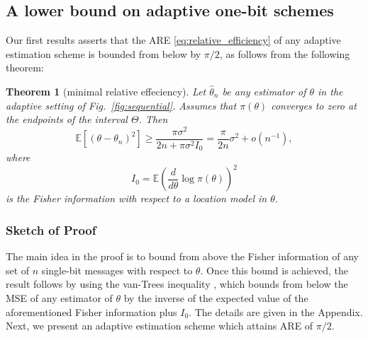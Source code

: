 \documentclass[letterpaper, conference]{IEEEtran}      %
\newtheorem{thm}{\bf{Theorem}}
\begin{document}
\subsection{A lower bound on adaptive one-bit schemes}
Our first results asserts that the ARE \eqref{eq:relative_efficiency} of any adaptive estimation scheme is bounded from below by $\pi/2$, as follows from the following theorem:
\begin{thm}[minimal relative effeciency] \label{thm:adpative_lower_bound}
Let $\widehat{\theta}_n$ be any estimator of $\theta$ in the adaptive setting of Fig.~\ref{fig:sequential}.
Assumes that $\pi(\theta)$ converges to zero at the endpoints of the interval $\Theta$. Then
\[
\mathbb E\left[ (\theta-\theta_n)^2 \right] \geq  \frac{\pi \sigma^2 }{2n +\pi \sigma^2  I_0}  =  \frac{\pi}{2n}\sigma^2+o(n^{-1}),
\]
where 
\[
I_0 = \mathbb E \left( \frac{d}{d\theta} \log \pi (\theta) \right)^2
\]
is the Fisher information with respect to a location model in $\theta$. 
\end{thm}

\subsubsection*{Sketch of Proof}
The main idea in the proof is to bound from above the Fisher information of any set of $n$ single-bit messages with respect to $\theta$. Once this bound is achieved, the result follows by using the van-Trees inequality \cite[Thm. 2.13]{tsybakov2008introduction},\cite{gill1995applications} which bounds from below the MSE of any estimator of $\theta$ by the inverse of the expected value of the aforementioned Fisher information plus $I_0$. The details are given in the Appendix.\\

Next, we present an adaptive estimation scheme which attains ARE of $\pi/2$. 
\end{document}
